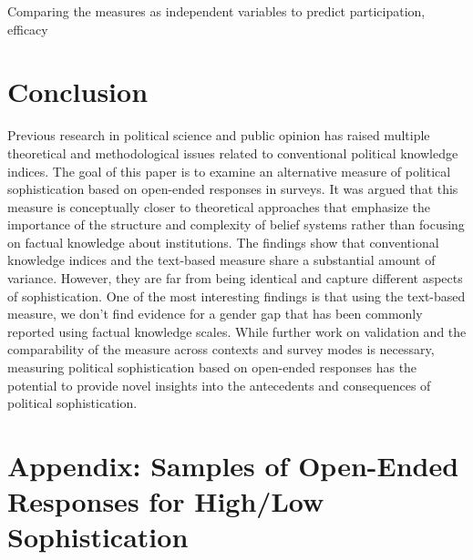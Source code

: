 \documentclass[12pt]{article}
\begin{document}
Comparing the measures as independent variables to predict participation, efficacy


\section*{Conclusion}

Previous research in political science and public opinion has raised multiple theoretical and methodological issues related to conventional political knowledge indices. The goal of this paper is to examine an alternative measure of political sophistication based on open-ended responses in surveys. It was argued that this measure is conceptually closer to theoretical approaches that emphasize the importance of the structure and complexity of belief systems rather than focusing on factual knowledge about institutions. The findings show that conventional knowledge indices and the text-based measure share a substantial amount of variance. However, they are far from being identical and capture different aspects of sophistication. One of the most interesting findings is that using the text-based measure, we don't find evidence for a gender gap that has been commonly reported using factual knowledge scales. While further work on validation and the comparability of the measure across contexts and survey modes is necessary, measuring political sophistication based on open-ended responses has the potential to provide novel insights into the antecedents and consequences of political sophistication.


\clearpage\singlespacing\footnotesize



\clearpage
\section{Appendix: Samples of Open-Ended Responses for High/Low Sophistication}\label{app:soph}
\end{document}

